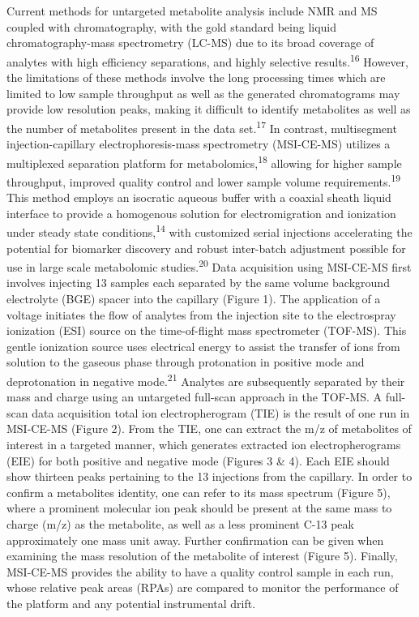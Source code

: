 \documentclass[journal=jacsat,manuscript=article]{achemso}
\begin{document}
Current methods for untargeted metabolite analysis include NMR and MS
coupled with chromatography, with the gold standard being liquid
chromatography-mass spectrometry (LC-MS) due to its broad coverage of
analytes with high efficiency separations, and highly selective
results.\textsuperscript{16} However, the limitations of these methods
involve the long processing times which are limited to low sample
throughput as well as the generated chromatograms may provide low
resolution peaks, making it difficult to identify metabolites as well as
the number of metabolites present in the data set.\textsuperscript{17}
In contrast, multisegment injection-capillary electrophoresis-mass
spectrometry (MSI-CE-MS) utilizes a multiplexed separation platform for
metabolomics,\textsuperscript{18} allowing for higher sample throughput,
improved quality control and lower sample volume
requirements.\textsuperscript{19} This method employs an isocratic
aqueous buffer with a coaxial sheath liquid interface to provide a
homogenous solution for electromigration and ionization under steady
state conditions,\textsuperscript{14} with customized serial injections
accelerating the potential for biomarker discovery and robust
inter-batch adjustment possible for use in large scale metabolomic
studies.\textsuperscript{20} Data acquisition using MSI-CE-MS first
involves injecting 13 samples each separated by the same volume
background electrolyte (BGE) spacer into the capillary (Figure 1). The
application of a voltage initiates the flow of analytes from the
injection site to the electrospray ionization (ESI) source on the
time-of-flight mass spectrometer (TOF-MS). This gentle ionization source
uses electrical energy to assist the transfer of ions from solution to
the gaseous phase through protonation in positive mode and deprotonation
in negative mode.\textsuperscript{21} Analytes are subsequently
separated by their mass and charge using an untargeted full-scan
approach in the TOF-MS. A full-scan data acquisition total ion
electropherogram (TIE) is the result of one run in MSI-CE-MS (Figure 2).
From the TIE, one can extract the m/z of metabolites of interest in a
targeted manner, which generates extracted ion electropherograms (EIE)
for both positive and negative mode (Figures 3 \& 4). Each EIE should
show thirteen peaks pertaining to the 13 injections from the capillary.
In order to confirm a metabolites identity, one can refer to its mass
spectrum (Figure 5), where a prominent molecular ion peak should be
present at the same mass to charge (m/z) as the metabolite, as well as a
less prominent C-13 peak approximately one mass unit away. Further
confirmation can be given when examining the mass resolution of the
metabolite of interest (Figure 5). Finally, MSI-CE-MS provides the
ability to have a quality control sample in each run, whose relative
peak areas (RPAs) are compared to monitor the performance of the
platform and any potential instrumental drift.
\end{document}
